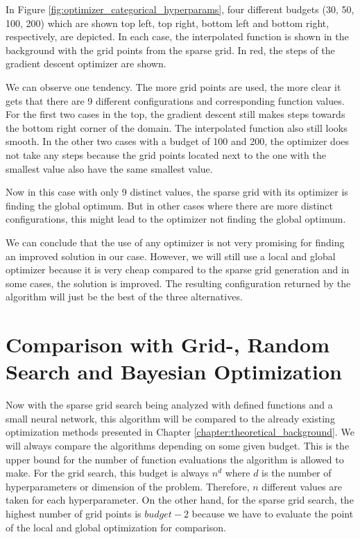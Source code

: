 In Figure \ref{fig:optimizer_categorical_hyperparams}, four different budgets (30, 50, 100, 200) which are shown top left, top right, bottom left and bottom right, respectively, are depicted. In each case, the interpolated function is shown in the background with the grid points from the sparse grid. In red, the steps of the gradient descent optimizer are shown. \newline 

We can observe one tendency. The more grid points are used, the more clear it gets that there are 9 different configurations and corresponding function values. For the first two cases in the top, the gradient descent still makes steps towards the bottom right corner of the domain. The interpolated function also still looks smooth. In the other two cases with a budget of 100 and 200, the optimizer does not take any steps because the grid points located next to the one with the smallest value also have the same smallest value. \newline 

Now in this case with only 9 distinct values, the sparse grid with its optimizer is finding the global optimum. But in other cases where there are more distinct configurations, this might lead to the optimizer not finding the global optimum. \newline


We can conclude that the use of any optimizer is not very promising for finding an improved solution in our case. However, we will still use a local and global optimizer because it is very cheap compared to the sparse grid generation and in some cases, the solution is improved. The resulting configuration returned by the algorithm will just be the best of the three alternatives. \newline


\section{Comparison with Grid-, Random Search and Bayesian Optimization}

Now with the sparse grid search being analyzed with defined functions and a small neural network, this algorithm will be compared to the already existing optimization methods presented in Chapter \ref{chapter:theoretical_background}. We will always compare the algorithms depending on some given budget. This is the upper bound for the number of function evaluations the algorithm is allowed to make. For the grid search, this budget is always $ n^d $ where $ d $ is the number of hyperparameters or dimension of the problem. Therefore, $ n $ different values are taken for each hyperparameter. On the other hand, for the sparse grid search, the highest number of grid points is $ budget - 2 $ because we have to evaluate the point of the local and global optimization for comparison. \newline 

